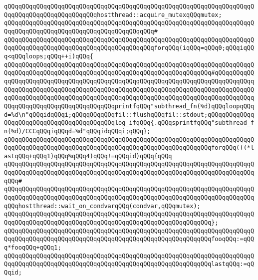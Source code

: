 \newline
\verb|qQQqqQQqqQQqqQQqqQQqqQQqqQQqqQQqqQQqqQQqqQQqqQQqqQQqqQQqqQQqqQQqqQQqqQQqqQQqqQQqqQQqqQQqqQQqqQQqhostthread::acquire_mutexqQQqmutex;|\newline
\verb|qQQqqQQqqQQqqQQqqQQqqQQqqQQqqQQqqQQqqQQqqQQqqQQqqQQqqQQqqQQqqQQqqQQqqQQqqQQqqQQqqQQqqQQqqQQqqQQqqQQqqQQqqQQqqQQq#|\newline
\verb|qQQqqQQqqQQqqQQqqQQqqQQqqQQqqQQqqQQqqQQqqQQqqQQqqQQqqQQqqQQqqQQqqQQqqQQqqQQqqQQqqQQqqQQqqQQqqQQqqQQqqQQqqQQqqQQqforqQQq(iqQQq=qQQq0;qQQqiqQQq<qQQqloops;qQQq++i)qQQq{|\newline
\verb|qQQqqQQqqQQqqQQqqQQqqQQqqQQqqQQqqQQqqQQqqQQqqQQqqQQqqQQqqQQqqQQqqQQqqQQqqQQqqQQqqQQqqQQqqQQqqQQqqQQqqQQqqQQqqQQqqQQqqQQqqQQqqQQq#qQQqqQQqqQQqqQQqqQQqqQQqqQQqqQQqqQQqqQQqqQQqqQQqqQQqqQQqqQQqqQQqqQQqqQQqqQQqqQQqqQQqqQQqqQQqqQQqqQQqqQQqqQQqqQQqqQQqqQQqqQQqqQQqqQQqqQQqqQQqqQQqqQQqqQQqqQQqqQQqqQQqqQQqqQQqqQQqqQQqqQQqqQQqqQQqqQQqqQQqqQQqqQQqqQQqqQQqqQQqqQQqqQQqqQQqqQQqqQQqqQQqqQQqqQQqprintfqQQq"subthread_fn(%d)qQQqloopqQQqd=%d\n"qQQqidqQQqi;qQQqqQQqqQQqfil::flushqQQqfil::stdout;qQQqqQQqqQQqqQQqqQQqqQQqqQQqqQQqqQQqqQQqqQQqlog_ifqQQq{.qQQqsprintfqQQq"subthread_fn(%d)/CCCqQQqiqQQqd=%d"qQQqidqQQqi;qQQq};|\newline
\verb|qQQqqQQqqQQqqQQqqQQqqQQqqQQqqQQqqQQqqQQqqQQqqQQqqQQqqQQqqQQqqQQqqQQqqQQqqQQqqQQqqQQqqQQqqQQqqQQqqQQqqQQqqQQqqQQqqQQqqQQqqQQqqQQqforqQQq(((*lastqQQq+qQQq1)qQQq%qQQq4)qQQq!=qQQqid)qQQq{qQQq|\newline
\verb|qQQqqQQqqQQqqQQqqQQqqQQqqQQqqQQqqQQqqQQqqQQqqQQqqQQqqQQqqQQqqQQqqQQqqQQqqQQqqQQqqQQqqQQqqQQqqQQqqQQqqQQqqQQqqQQqqQQqqQQqqQQqqQQqqQQqqQQqqQQqqQQq#|\newline
\verb|qQQqqQQqqQQqqQQqqQQqqQQqqQQqqQQqqQQqqQQqqQQqqQQqqQQqqQQqqQQqqQQqqQQqqQQqqQQqqQQqqQQqqQQqqQQqqQQqqQQqqQQqqQQqqQQqqQQqqQQqqQQqqQQqqQQqqQQqqQQqqQQqhostthread::wait_on_condvarqQQq(condvar,qQQqmutex);|\newline
\verb|qQQqqQQqqQQqqQQqqQQqqQQqqQQqqQQqqQQqqQQqqQQqqQQqqQQqqQQqqQQqqQQqqQQqqQQqqQQqqQQqqQQqqQQqqQQqqQQqqQQqqQQqqQQqqQQqqQQqqQQqqQQqqQQq};|\newline
\newline
\verb|qQQqqQQqqQQqqQQqqQQqqQQqqQQqqQQqqQQqqQQqqQQqqQQqqQQqqQQqqQQqqQQqqQQqqQQqqQQqqQQqqQQqqQQqqQQqqQQqqQQqqQQqqQQqqQQqqQQqqQQqqQQqqQQqfooqQQq:=qQQq*fooqQQq+qQQq1;|\newline
\verb|qQQqqQQqqQQqqQQqqQQqqQQqqQQqqQQqqQQqqQQqqQQqqQQqqQQqqQQqqQQqqQQqqQQqqQQqqQQqqQQqqQQqqQQqqQQqqQQqqQQqqQQqqQQqqQQqqQQqqQQqqQQqqQQqlastqQQq:=qQQqid;|\newline
